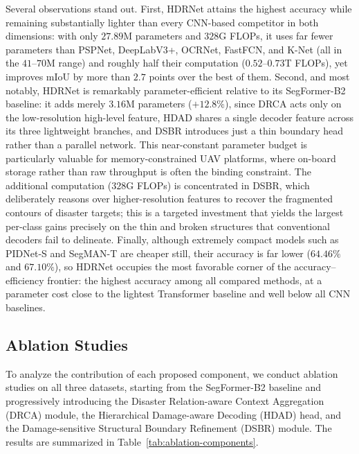 \documentclass[lettersize,journal]{IEEEtran}
\begin{document}
Several observations stand out. First, HDRNet attains the highest accuracy while remaining substantially lighter than every CNN-based competitor in both dimensions: with only $27.89$M parameters and $328$G FLOPs, it uses far fewer parameters than PSPNet, DeepLabV3+, OCRNet, FastFCN, and K-Net (all in the $41$--$70$M range) and roughly half their computation ($0.52$--$0.73$T FLOPs), yet improves mIoU by more than $2.7$ points over the best of them. Second, and most notably, HDRNet is remarkably parameter-efficient relative to its SegFormer-B2 baseline: it adds merely $3.16$M parameters ($+12.8\%$), since DRCA acts only on the low-resolution high-level feature, HDAD shares a single decoder feature across its three lightweight branches, and DSBR introduces just a thin boundary head rather than a parallel network. This near-constant parameter budget is particularly valuable for memory-constrained UAV platforms, where on-board storage rather than raw throughput is often the binding constraint. The additional computation ($328$G FLOPs) is concentrated in DSBR, which deliberately reasons over higher-resolution features to recover the fragmented contours of disaster targets; this is a targeted investment that yields the largest per-class gains precisely on the thin and broken structures that conventional decoders fail to delineate. Finally, although extremely compact models such as PIDNet-S and SegMAN-T are cheaper still, their accuracy is far lower ($64.46\%$ and $67.10\%$), so HDRNet occupies the most favorable corner of the accuracy--efficiency frontier: the highest accuracy among all compared methods, at a parameter cost close to the lightest Transformer baseline and well below all CNN baselines.

\subsection{Ablation Studies}
To analyze the contribution of each proposed component, we conduct ablation studies on all three datasets, starting from the SegFormer-B2 baseline and progressively introducing the Disaster Relation-aware Context Aggregation (DRCA) module, the Hierarchical Damage-aware Decoding (HDAD) head, and the Damage-sensitive Structural Boundary Refinement (DSBR) module. The results are summarized in Table~\ref{tab:ablation-components}.
\end{document}

